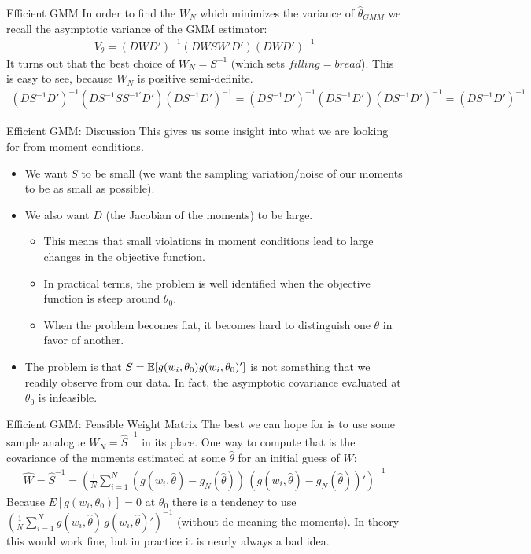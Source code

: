 \begin{frame}{Efficient GMM}
 In order to find the $W_N$ which minimizes the variance of $\hat{\theta}_{GMM}$ we recall the asymptotic variance of the GMM estimator:
\begin{eqnarray*}
V_{\theta} =(D W D')^{-1} (D W S W' D') (D W D')^{-1}
\end{eqnarray*}
It turns out that the best choice of $W_N = S^{-1}$ (which sets $filling = bread$). This is easy to see, because $W_N$ is positive semi-definite.
\begin{eqnarray*}
(D S^{-1} D')^{-1} (D S^{-1} S S^{-1'} D') (D S^{-1} D')^{-1} = (D S^{-1} D')^{-1} (D S^{-1} D') (D S^{-1} D')^{-1} = (D S^{-1} D')^{-1}
\end{eqnarray*}
\end{frame}

\begin{frame}{Efficient GMM: Discussion}
This gives us some insight into what we are looking for from moment conditions. 

\begin{itemize}
\item We want $S$ to be small (we want the sampling variation/noise of our moments to be as small as possible). 
\item We also want $D$ (the Jacobian of the moments) to be large. 
\begin{itemize}
\item This means that small violations in moment conditions lead to large changes in the objective function. 
\item In practical terms, the problem is well identified when the objective function is steep around $\theta_0$.
\item When the problem becomes flat, it becomes hard to distinguish one $\theta$ in favor of another.
\end{itemize}
\item The problem is that $S = \mathbb{E}[g(w_i,\theta_0) g(w_i,\theta_0)']$ is not something that we readily observe from our data. In fact, the asymptotic covariance evaluated at $\theta_0$ is \alert{infeasible}.
\end{itemize}
\end{frame}

\begin{frame}{Efficient GMM: Feasible Weight Matrix}
The best we can hope for is to use some sample analogue $W_N=\hat{S}^{-1}$ in its place. One way to compute that is the covariance of the moments estimated at some $\hat{\theta}$ for an initial guess of $W$:
\begin{eqnarray*}
\hat{W} = \hat{S}^{-1} = \left(\frac{1}{N} \sum_{i=1}^N (g(w_i,\hat{\theta}) - g_N(\hat{\theta}))  \, (g(w_i,\hat{\theta}) - g_N(\hat{\theta}))'\right)^{-1}
\end{eqnarray*}
Because $E[g(w_i,\theta_0)]=0$ at $\theta_0$ there is a tendency to use $\left(\frac{1}{N} \sum_{i=1}^N g(w_i,\hat{\theta}) \, g(w_i,\hat{\theta} )'\right)^{-1}$ (without de-meaning the moments). In theory this would work fine, but in practice \alert{it is nearly always a bad idea}.\\
\end{frame}


